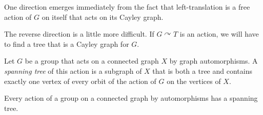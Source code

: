 \documentclass[10pt]{mypackage}
\begin{document}
One direction emerges immediately from the fact that left-translation is a free action of $G$ on itself that acts on its Cayley graph.

The reverse direction is a little more difficult. If $G\curvearrowright T$ is an action, we will have to find a tree that is a Cayley graph for $G$.
\begin{definition}
  Let $G$ be a group that acts on a connected graph $X$ by graph automorphisms. A \textit{spanning tree} of this action is a subgraph of $X$ that is both a tree and contains exactly one vertex of every orbit of the action of $G$ on the vertices of $X$.
\end{definition}
\begin{theorem}
  Every action of a group on a connected graph by automorphisms has a spanning tree.
\end{theorem}
\end{document}
